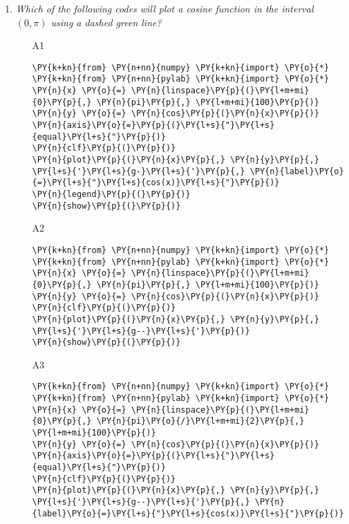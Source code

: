 \begin{enumerate}
\vspace{6mm}

\item {\em Which of the following codes will plot a cosine function 
in the interval $(0, \pi)$ using a dashed green line?}\\

\begin{enumerate}
\item[A1] 
\begin{Verbatim}[commandchars=\\\{\}]
\PY{k+kn}{from} \PY{n+nn}{numpy} \PY{k+kn}{import} \PY{o}{*}
\PY{k+kn}{from} \PY{n+nn}{pylab} \PY{k+kn}{import} \PY{o}{*}
\PY{n}{x} \PY{o}{=} \PY{n}{linspace}\PY{p}{(}\PY{l+m+mi}{0}\PY{p}{,} \PY{n}{pi}\PY{p}{,} \PY{l+m+mi}{100}\PY{p}{)}
\PY{n}{y} \PY{o}{=} \PY{n}{cos}\PY{p}{(}\PY{n}{x}\PY{p}{)}
\PY{n}{axis}\PY{o}{=}\PY{p}{(}\PY{l+s}{"}\PY{l+s}{equal}\PY{l+s}{"}\PY{p}{)}
\PY{n}{clf}\PY{p}{(}\PY{p}{)}
\PY{n}{plot}\PY{p}{(}\PY{n}{x}\PY{p}{,} \PY{n}{y}\PY{p}{,} \PY{l+s}{'}\PY{l+s}{g-}\PY{l+s}{'}\PY{p}{,} \PY{n}{label}\PY{o}{=}\PY{l+s}{"}\PY{l+s}{cos(x)}\PY{l+s}{"}\PY{p}{)}
\PY{n}{legend}\PY{p}{(}\PY{p}{)}
\PY{n}{show}\PY{p}{(}\PY{p}{)}
\end{Verbatim}
\item[A2] 
\begin{Verbatim}[commandchars=\\\{\}]
\PY{k+kn}{from} \PY{n+nn}{numpy} \PY{k+kn}{import} \PY{o}{*}
\PY{k+kn}{from} \PY{n+nn}{pylab} \PY{k+kn}{import} \PY{o}{*}
\PY{n}{x} \PY{o}{=} \PY{n}{linspace}\PY{p}{(}\PY{l+m+mi}{0}\PY{p}{,} \PY{n}{pi}\PY{p}{,} \PY{l+m+mi}{100}\PY{p}{)}
\PY{n}{y} \PY{o}{=} \PY{n}{cos}\PY{p}{(}\PY{n}{x}\PY{p}{)}
\PY{n}{clf}\PY{p}{(}\PY{p}{)}
\PY{n}{plot}\PY{p}{(}\PY{n}{x}\PY{p}{,} \PY{n}{y}\PY{p}{,} \PY{l+s}{'}\PY{l+s}{g--}\PY{l+s}{'}\PY{p}{)}
\PY{n}{show}\PY{p}{(}\PY{p}{)}
\end{Verbatim}
\item[A3] 
\begin{Verbatim}[commandchars=\\\{\}]
\PY{k+kn}{from} \PY{n+nn}{numpy} \PY{k+kn}{import} \PY{o}{*}
\PY{k+kn}{from} \PY{n+nn}{pylab} \PY{k+kn}{import} \PY{o}{*}
\PY{n}{x} \PY{o}{=} \PY{n}{linspace}\PY{p}{(}\PY{l+m+mi}{0}\PY{p}{,} \PY{n}{pi}\PY{o}{/}\PY{l+m+mi}{2}\PY{p}{,} \PY{l+m+mi}{100}\PY{p}{)}
\PY{n}{y} \PY{o}{=} \PY{n}{cos}\PY{p}{(}\PY{n}{x}\PY{p}{)}
\PY{n}{axis}\PY{o}{=}\PY{p}{(}\PY{l+s}{"}\PY{l+s}{equal}\PY{l+s}{"}\PY{p}{)}
\PY{n}{clf}\PY{p}{(}\PY{p}{)}
\PY{n}{plot}\PY{p}{(}\PY{n}{x}\PY{p}{,} \PY{n}{y}\PY{p}{,} \PY{l+s}{'}\PY{l+s}{g--}\PY{l+s}{'}\PY{p}{,} \PY{n}{label}\PY{o}{=}\PY{l+s}{"}\PY{l+s}{cos(x)}\PY{l+s}{"}\PY{p}{)}

\end{Verbatim}
\end{enumerate}
\end{enumerate}
